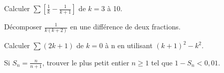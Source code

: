 \documentclass[11pt]{article}
\begin{document}
Calculer \(\sum [\frac{1}{k}-\frac{1}{k+1}]\) de \(k=3\) à 10.\par
\vspace{5pt}
Décomposer \(\frac{1}{k(k+2)}\) en une différence de deux fractions.\par
\vspace{5pt}
Calculer \(\sum (2k+1)\) de \(k=0\) à n en utilisant \((k+1)^{2}-k^{2}\).\par
\vspace{5pt}
Si \(S_{n}=\frac{n}{n+1}\), trouver le plus petit entier \(n\geq 1\) tel que \(1-S_{n}<0,01\).\par
\vspace{5pt}
\end{document}
